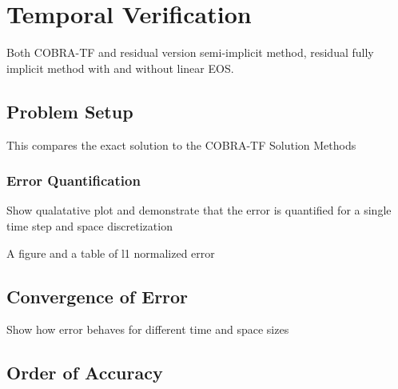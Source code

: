 \documentclass{mc2015}
\begin{document}
\section{Temporal Verification}

Both COBRA-TF and residual version semi-implicit method, residual fully implicit
method with and without linear EOS.

\subsection{Problem Setup}

This compares the exact solution to the COBRA-TF Solution Methods

\subsubsection{Error Quantification}

Show qualatative plot and demonstrate that the error is quantified 
for a single time step and space discretization

A figure and a table of l1 normalized error

\subsection{Convergence of Error}

Show how error behaves for different time and space sizes

\subsection{Order of Accuracy}

%
%
%
%
%
%
%
%
\end{document}
